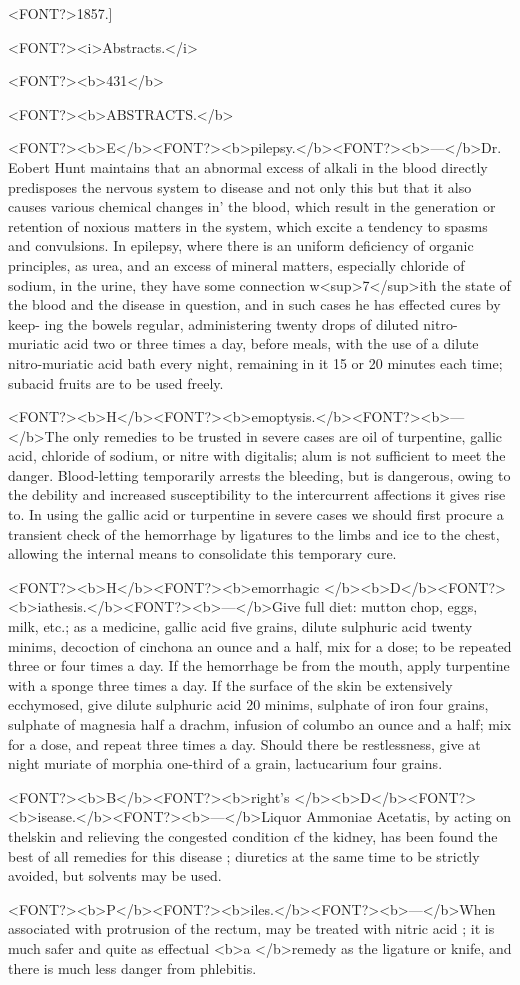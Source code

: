 <FONT?>1857.]

<FONT?><i>Abstracts.</i>

<FONT?><b>431</b>

<FONT?><b>ABSTRACTS.</b>

<FONT?><b>E</b><FONT?><b>pilepsy.</b><FONT?><b>---</b>Dr. Eobert Hunt maintains that an abnormal excess of
alkali in the blood directly predisposes the nervous system to disease
and not only this but that it also causes various chemical changes in'
the blood, which result in the generation or retention of noxious matters
in the system, which excite a tendency to spasms and convulsions. In
epilepsy, where there is an uniform deficiency of organic principles, as
urea, and an excess of mineral matters, especially chloride of sodium,
in the urine, they have some connection w<sup>7</sup>ith the state of the blood and
the disease in question, and in such cases he has effected cures by keep-
ing the bowels regular, administering twenty drops of diluted nitro-
muriatic acid two or three times a day, before meals, with the use of a
dilute nitro-muriatic acid bath every night, remaining in it 15 or 20
minutes each time; subacid fruits are to be used freely.

<FONT?><b>H</b><FONT?><b>emoptysis.</b><FONT?><b>---</b>The only remedies to be trusted in severe cases are oil
of turpentine, gallic acid, chloride of sodium, or nitre with digitalis;
alum is not sufficient to meet the danger. Blood-letting temporarily
arrests the bleeding, but is dangerous, owing to the debility and increased
susceptibility to the intercurrent affections it gives rise to. In using the
gallic acid or turpentine in severe cases we should first procure a transient
check of the hemorrhage by ligatures to the limbs and ice to the chest,
allowing the internal means to consolidate this temporary cure.

<FONT?><b>H</b><FONT?><b>emorrhagic </b><b>D</b><FONT?><b>iathesis.</b><FONT?><b>---</b>Give full diet: mutton chop, eggs, milk,
etc.; as a medicine, gallic acid five grains, dilute sulphuric acid twenty
minims, decoction of cinchona an ounce and a half, mix for a dose; to
be repeated three or four times a day. If the hemorrhage be from the
mouth, apply turpentine with a sponge three times a day. If the surface
of the skin be extensively ecchymosed, give dilute sulphuric acid 20
minims, sulphate of iron four grains, sulphate of magnesia half a drachm,
infusion of columbo an ounce and a half; mix for a dose, and repeat
three times a day. Should there be restlessness, give at night muriate
of morphia one-third of a grain, lactucarium four grains.

<FONT?><b>B</b><FONT?><b>right's </b><b>D</b><FONT?><b>isease.</b><FONT?><b>---</b>Liquor Ammoniae Acetatis, by acting on thelskin
and relieving the congested condition cf the kidney, has been found the
best of all remedies for this disease ; diuretics at the same time to be
strictly avoided, but solvents may be used.

<FONT?><b>P</b><FONT?><b>iles.</b><FONT?><b>---</b>When associated with protrusion of the rectum, may be
treated with nitric acid ; it is much safer and quite as effectual <b>a
</b>remedy as the ligature or knife, and there is much less danger from
phlebitis.\endinput
